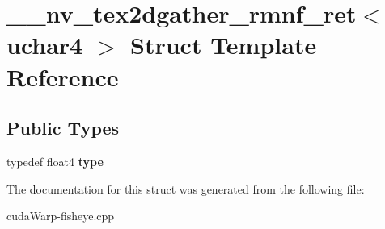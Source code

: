 \hypertarget{struct____nv__tex2dgather__rmnf__ret_3_01uchar4_01_4}{}\section{\+\_\+\+\_\+nv\+\_\+tex2dgather\+\_\+rmnf\+\_\+ret$<$ uchar4 $>$ Struct Template Reference}
\label{struct____nv__tex2dgather__rmnf__ret_3_01uchar4_01_4}
\subsection*{Public Types}
\begin{DoxyCompactItemize}
\item 
typedef float4 {\bfseries type}\hypertarget{struct____nv__tex2dgather__rmnf__ret_3_01uchar4_01_4_ab8146f22636a3f9c293705b42a834c69}{}\label{struct____nv__tex2dgather__rmnf__ret_3_01uchar4_01_4_ab8146f22636a3f9c293705b42a834c69}

\end{DoxyCompactItemize}


The documentation for this struct was generated from the following file\+:\begin{DoxyCompactItemize}
\item 
cuda\+Warp-\/fisheye.\+cpp\end{DoxyCompactItemize}
